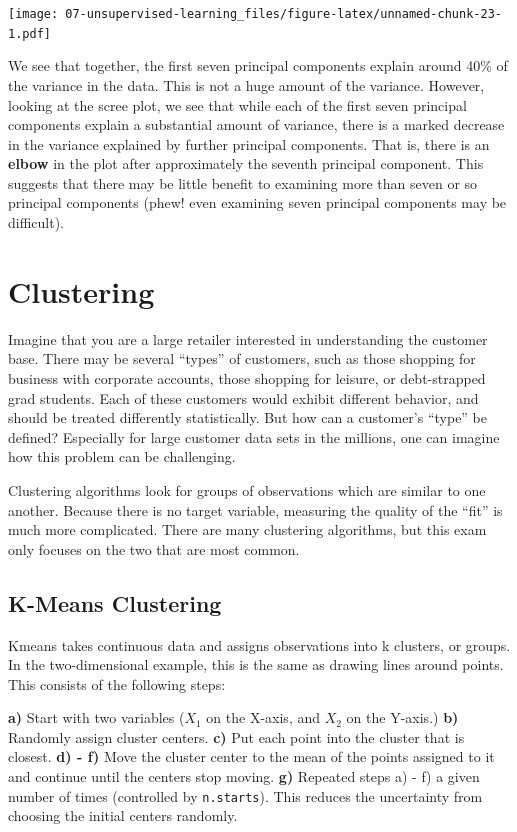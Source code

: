 \documentclass[openany]{book}
\begin{document}
\texttt{[image: 07-unsupervised-learning\_files/figure-latex/unnamed-chunk-23-1.pdf]}

We see that together, the first seven principal components
explain around 40\% of the variance in the data. This is not a huge amount
of the variance. However, looking at the scree plot, we see that while each
of the first seven principal components explain a substantial amount of
variance, there is a marked decrease in the variance explained by further
principal components. That is, there is an \textbf{elbow} in the plot after approximately
the seventh principal component. This suggests that there may
be little benefit to examining more than seven or so principal components
(phew! even examining seven principal components may be difficult).

\hypertarget{clustering}{%
\section{Clustering}\label{clustering}}

Imagine that you are a large retailer interested in understanding the customer base. There may be several ``types'' of customers, such as those shopping for business with corporate accounts, those shopping for leisure, or debt-strapped grad students. Each of these customers would exhibit different behavior, and should be treated differently statistically. But how can a customer's ``type'' be defined? Especially for large customer data sets in the millions, one can imagine how this problem can be challenging.

Clustering algorithms look for groups of observations which are similar to one another. Because there is no target variable, measuring the quality of the ``fit'' is much more complicated. There are many clustering algorithms, but this exam only focuses on the two that are most common.

\hypertarget{k-means-clustering}{%
\subsection{K-Means Clustering}\label{k-means-clustering}}

Kmeans takes continuous data and assigns observations into k clusters, or groups. In the two-dimensional example, this is the same as drawing lines around points. This consists of the following steps:

\textbf{a)} Start with two variables (\(X_1\) on the X-axis, and \(X_2\) on the Y-axis.)
\textbf{b)} Randomly assign cluster centers.
\textbf{c)} Put each point into the cluster that is closest.
\textbf{d) - f)} Move the cluster center to the mean of the points assigned to it and continue until the centers stop moving.
\textbf{g)} Repeated steps a) - f) a given number of times (controlled by \texttt{n.starts}). This reduces the uncertainty from choosing the initial centers randomly.
\end{document}
